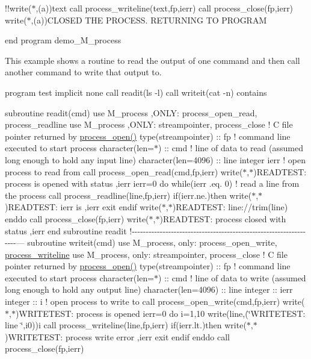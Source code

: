 !!write($\ast$,\textquotesingle{}(a)\textquotesingle{})text call process\+\_\+writeline(text,fp,ierr) call process\+\_\+close(fp,ierr) write($\ast$,\textquotesingle{}(a)\textquotesingle{})\textquotesingle{}C\+L\+O\+S\+ED T\+HE P\+R\+O\+C\+E\+SS. R\+E\+T\+U\+R\+N\+I\+NG TO P\+R\+O\+G\+R\+AM\textquotesingle{}

end program demo\+\_\+\+M\+\_\+process

This example shows a routine to read the output of one command and then call another command to write that output to.

program test implicit none call readit(\textquotesingle{}ls -\/l\textquotesingle{}) call writeit(\textquotesingle{}cat -\/n\textquotesingle{}) contains

subroutine readit(cmd) use M\+\_\+process ,O\+N\+LY\+: process\+\_\+open\+\_\+read, process\+\_\+readline use M\+\_\+process ,O\+N\+LY\+: streampointer, process\+\_\+close ! C file pointer returned by \mbox{\hyperlink{namespacem__process_a3c0f543a9ceff2671041d73660f60a59}{process\+\_\+open()}} type(streampointer) \+:\+: fp ! command line executed to start process character(len=$\ast$) \+:\+: cmd ! line of data to read (assumed long enough to hold any input line) character(len=4096) \+:\+: line integer ierr ! open process to read from call process\+\_\+open\+\_\+read(cmd,fp,ierr) write($\ast$,$\ast$)\textquotesingle{}R\+E\+A\+D\+T\+E\+ST\+: process is opened with status \textquotesingle{},ierr ierr=0 do while(ierr .eq. 0) ! read a line from the process call process\+\_\+readline(line,fp,ierr) if(ierr.\+ne.)then write($\ast$,$\ast$)\textquotesingle{}R\+E\+A\+D\+T\+E\+ST\+: ierr is \textquotesingle{},ierr exit endif write($\ast$,$\ast$)\textquotesingle{}R\+E\+A\+D\+T\+E\+ST\+: line\+:\textquotesingle{}//trim(line) enddo call process\+\_\+close(fp,ierr) write($\ast$,$\ast$)\textquotesingle{}R\+E\+A\+D\+T\+E\+ST\+: process closed with status \textquotesingle{},ierr end subroutine readit !-\/-\/-\/-\/-\/-\/-\/-\/-\/-\/-\/-\/-\/-\/-\/-\/-\/-\/-\/-\/-\/-\/-\/-\/-\/-\/-\/-\/-\/-\/-\/-\/-\/-\/-\/-\/-\/-\/-\/-\/-\/-\/-\/-\/-\/-\/-\/-\/-\/-\/-\/-\/-\/-\/-\/-\/-\/-\/-\/-\/-\/-\/-\/-\/-\/-\/--- subroutine writeit(cmd) use M\+\_\+process, only\+: process\+\_\+open\+\_\+write, \mbox{\hyperlink{interfacem__process_1_1process__writeline}{process\+\_\+writeline}} use M\+\_\+process, only\+: streampointer, process\+\_\+close ! C file pointer returned by \mbox{\hyperlink{namespacem__process_a3c0f543a9ceff2671041d73660f60a59}{process\+\_\+open()}} type(streampointer) \+:\+: fp ! command line executed to start process character(len=$\ast$) \+:\+: cmd ! line of data to write (assumed long enough to hold any output line) character(len=4096) \+:\+: line integer \+:\+: ierr integer \+:\+: i ! open process to write to call process\+\_\+open\+\_\+write(cmd,fp,ierr) write($\ast$,$\ast$)\textquotesingle{}W\+R\+I\+T\+E\+T\+E\+ST\+: process is opened\textquotesingle{} ierr=0 do i=1,10 write(line,\textquotesingle{}(\char`\"{}\+W\+R\+I\+T\+E\+T\+E\+S\+T\+: line \char`\"{},i0)\textquotesingle{})i call process\+\_\+writeline(line,fp,ierr) if(ierr.\+lt.)then write($\ast$,$\ast$)\textquotesingle{}W\+R\+I\+T\+E\+T\+E\+ST\+: process write error \textquotesingle{},ierr exit endif enddo call process\+\_\+close(fp,ierr) 